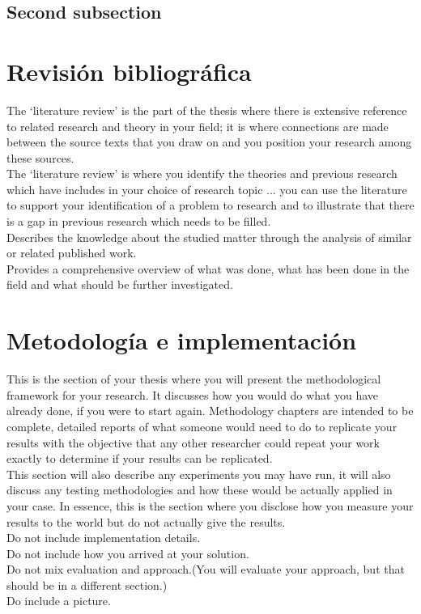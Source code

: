 \documentclass[11pt,a4paper,oldfontcommands]{memoir}
\begin{document}
\begin{multicols}{2}
\subsection{Second subsection}

\section{Revisión bibliográfica}
The ‘literature review’ is the part of the thesis where there is
extensive reference to related research and theory in your field; it is
where connections are made between the source texts that you draw
on and you position your research among these sources.
\\

The ‘literature review’ is where you identify the theories and
previous research which have includes in your choice of research
topic ... you can use the literature to support your
identification of a problem to research and to illustrate that there is
a gap in previous research which needs to be filled.
\\

Describes the knowledge about the studied matter through the
analysis of similar or related published work.
\\Provides a comprehensive overview of what was done, what has
been done in the field and what should be further investigated.
\\



\section{Metodología e implementación}
This is the section of your thesis where you will present the methodological framework
for your research. It discusses how you would do what you have already done, if you
were to start again. Methodology chapters are intended to be complete, detailed reports of
what someone would need to do to replicate your results with the objective that any other
researcher could repeat your work exactly to determine if your results can be replicated.
\\

This section will also describe any experiments you may have run, it will also discuss any testing methodologies and how these would be actually applied in your case. In essence, this is the section where you disclose how you measure your results to the world but do not actually give the results.
\\
Do not include implementation details.\\
Do not include how you arrived at your solution.\\
Do not mix evaluation and approach.(You will evaluate your approach, but that should be in a different section.)\\
Do include a picture.\\


\end{multicols}
\end{document}
